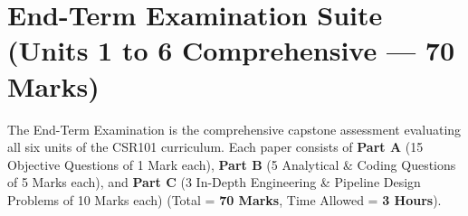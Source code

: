 \documentclass[a4paper,11pt,oneside,openany]{book}
\begin{document}
\newpage

\newpage


\chapter{End-Term Examination Suite (Units 1 to 6 Comprehensive --- 70 Marks)}
\label{chap:endterm}
\noindent
The End-Term Examination is the comprehensive capstone assessment evaluating all six units of the CSR101 curriculum. Each paper consists of \textbf{Part A} (15 Objective Questions of 1 Mark each), \textbf{Part B} (5 Analytical \& Coding Questions of 5 Marks each), and \textbf{Part C} (3 In-Depth Engineering \& Pipeline Design Problems of 10 Marks each) (Total = \textbf{70 Marks}, Time Allowed = \textbf{3 Hours}).

\newpage

\newpage

\end{document}
